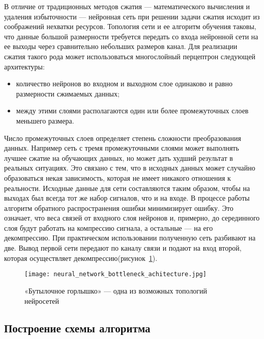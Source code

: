 В отличие от традиционных методов сжатия --- математического вычисления и удаления избыточности --- нейронная сеть при
решении задачи сжатия исходит из соображений нехватки ресурсов. Топология сети и ее алгоритм обучения таковы,
что данные большой размерности требуется передать со входа нейронной сети на ее выходы через сравнительно небольших размеров канал.
Для реализации сжатия такого рода может использоваться многослойный перцептрон следующей архитектуры:
\begin{itemize}
  \item количество нейронов во входном и выходном слое одинаково и равно размерности сжимаемых данных;
  \item между этими слоями располагаются один или более промежуточных слоев меньшего размера.
\end{itemize}
Число промежуточных слоев определяет степень сложности преобразования данных. Например сеть с тремя промежуточными слоями
может выполнять лучшее сжатие на обучающих данных, но может дать худший результат в реальных ситуациях. Это связано с тем,
что в исходных данных может случайно образоваться некая зависимость, которая не имеет никакого отношения к реальности.
Исходные данные для сети составляются таким образом, чтобы на выходах был всегда тот же набор сигналов, что и на входе.
В процессе работы алгоритм обратного распространения ошибки минимизирует ошибку. Это означает, что веса связей от входного слоя нейронов и,
примерно, до серединного слоя будут работать на компрессию сигнала, а остальные --- на его декомпрессию.
При практическом использовании полученную сеть разбивают на две. Вывод первой сети передают по каналу связи и подают на вход второй,
которая осуществляет декомпрессию(рисунок~\ref{fig:bottleneck_achitecture}).

\begin{figure}[ht]
\centering
  \texttt{[image: neural\_network\_bottleneck\_achitecture.jpg]}
  \caption{ «Бутылочное горлышко» — одна из возможных топологий нейросетей }
  \label{fig:bottleneck_achitecture}
\end{figure}

\subsection{Построение схемы алгоритма}
\label{sub:research:algorithm}

